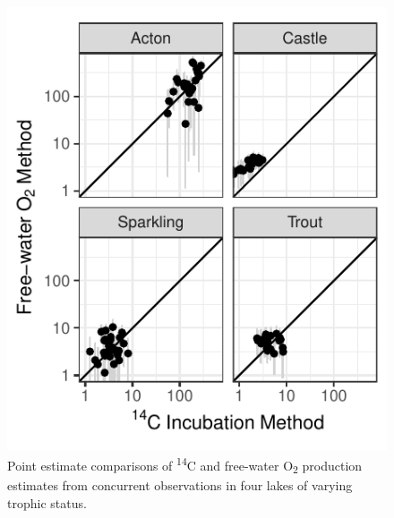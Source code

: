 \documentclass[12pt, oneside]{article}
\begin{document}
\newpage
\begin{figure}
\centering
\includegraphics{lake_values.pdf}
\caption{Point estimate comparisons of \textsuperscript{14}C and free-water O\textsubscript{2} production estimates from concurrent observations in four lakes of varying trophic status.}
\label{fig:lakevalues}
\end{figure}
\clearpage
\end{document}
